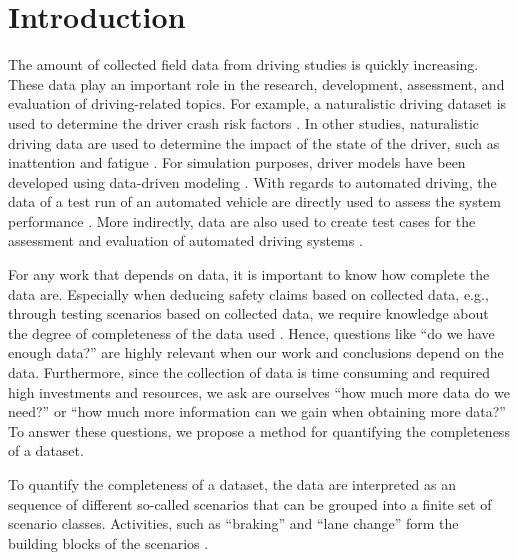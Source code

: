 \section{Introduction}
\label{sec:introduction}

The amount of collected field data from driving studies is quickly increasing. These data play an important role in the research, development, assessment, and evaluation of driving-related topics. For example, a naturalistic driving dataset is used to determine the driver crash risk factors \cite{dingus2016crashrisk}. In other studies, naturalistic driving data are used to determine the impact of the state of the driver, such as inattention \cite{klauer2006impact} and fatigue \cite{williamson2011link}. For simulation purposes, driver models have been developed using data-driven modeling \cite{sadigh2014data}. With regards to automated driving, the data of a test run of an automated vehicle are directly used to assess the system performance \cite{broggi2013extensive}. More indirectly, data are also used to create test cases for the assessment and evaluation of automated driving systems \cite{zofka2015datadrivetrafficscenarios, elrofai2018scenario, deGelder2017assessment, ploeg2018cetran, putz2017pegasus}.

For any work that depends on data, it is important to know how complete the data are. Especially when deducing safety claims based on collected data, e.g., through testing scenarios based on collected data, we require knowledge about the degree of completeness of the data used \cite{geyer2014, stellet2015taxonomy, alvarez2017prospective}. Hence, questions like ``do we have enough data?'' are highly relevant when our work and conclusions depend on the data. Furthermore, since the collection of data is time consuming and required high investments and resources, we ask are ourselves ``how much more data do we need?'' or ``how much more information can we gain when obtaining more data?'' To answer these questions, we propose a method for quantifying the completeness of a dataset. 

To quantify the completeness of a dataset, the data are interpreted as an sequence of different so-called scenarios that can be grouped into a finite set of scenario classes. Activities, such as ``braking'' and ``lane change'' form the building blocks of the scenarios \cite{elrofai2018scenario}.
